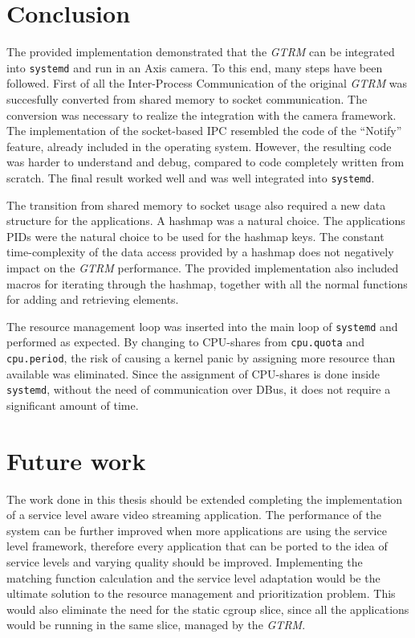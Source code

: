 \documentclass[nobiblatex]{LTHthesis}
\begin{document}
\section{Conclusion}

The provided implementation demonstrated that the \emph{GTRM} can be integrated into
\texttt{systemd} and run in an Axis camera. To this end, many steps have been
followed. First of all the Inter-Process Communication of the original \emph{GTRM}
was succesfully converted from shared memory to socket communication. The
conversion was necessary to realize the integration with the camera
framework. The implementation of the socket-based IPC resembled the
code of the ``Notify'' feature, already included in the operating system.
However, the resulting code was harder to understand and debug, compared to
code completely written from scratch. The final result worked well and was
well integrated into \texttt{systemd}.

The transition from shared memory to socket usage also required a new data
structure for the applications. A hashmap was a natural choice. The
applications PIDs were the natural choice to be used for the hashmap keys.
The constant time-complexity of the data access provided by a hashmap does not
negatively impact on the \emph{GTRM} performance. The provided implementation also
included macros for iterating through the hashmap, together with all the
normal functions for adding and retrieving elements. 

The resource management loop was inserted into the main loop of 
\texttt{systemd} and performed as expected. By changing to CPU-shares from
\texttt{cpu.quota} and \texttt{cpu.period}, the risk of causing a kernel 
panic by assigning more resource than available was eliminated. Since the
assignment of CPU-shares is done inside \texttt{systemd}, without the need of
communication over DBus, it does not require a significant amount of time.



\section{Future work}

The work done in this thesis should be extended completing the implementation
of a service level aware video streaming application. The performance of
the system can be further improved when more applications are using the
service level framework, therefore every application that can be ported to
the idea of service levels and varying quality should be improved.
Implementing the matching function calculation and the service level
adaptation would be the ultimate solution to the resource management and
prioritization problem. This would also eliminate the need for the static
cgroup slice, since all the applications would be running in the same slice,
managed by the \emph{GTRM}.
\end{document}
